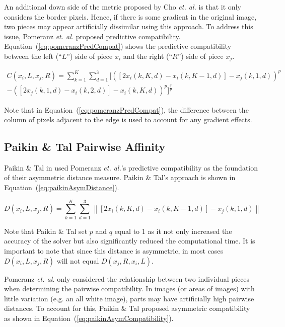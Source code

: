 \documentclass{report}
\def\eref#1{(\ref{#1})}
\newcommand{\norm}[1]{\left\lVert#1\right\rVert}
\begin{document}
An additional down side of the metric proposed by Cho \textit{et. al.} is that it only considers the border pixels.  Hence, if there is some gradient in the original image, two pieces may appear artificially dissimilar using this approach.  To address this issue, Pomeranz \textit{et. al.} proposed predictive compatibility.  Equation~\eref{eq:pomeranzPredCompat} shows the predictive compatibility between the left (``$L$'') side of piece $x_i$ and the right (``$R$'') side of piece $x_j$.  

\begin{equation} \label{eq:pomeranzPredCompat}
\begin{split}
C(x_i,L,x_j,R) = \sum_{k=1}^{K}\sum_{d=1}^{3}\Big[ ([2x_i(k, K, d) - x_i(k, K-1, d)] - x_j(k, 1, d))^p \\ - ([2x_j(k, 1, d) - x_i(k, 2, d)] - x_i(k, K, d))^p\Big]^{\frac{q}{p}}
\end{split}
\end{equation}

Note that in Equation~\eref{eq:pomeranzPredCompat}, the difference between the column of pixels adjacent to the edge is used to account for any gradient effects.

\subsection{Paikin \& Tal Pairwise Affinity}\label{sec:paikinPairwiseAffinity}

Paikin \& Tal in \cite{paikin2015} used Pomeranz \textit{et. al.}'s predictive compatibility as the foundation of their asymmetric distance measure.  Paikin \& Tal's approach is shown in Equation~\eref{eq:paikinAsymDistance}.

\begin{equation} \label{eq:paikinAsymDistance}
D(x_i,L,x_j,R) = \sum_{k=1}^{K}\sum_{d=1}^{3} \norm{[2x_i(k, K, d) - x_i(k, K-1, d)] - x_j(k, 1, d)}
\end{equation}

Note that Paikin \& Tal set $p$ and $q$ equal to 1 as it not only increased the accuracy of the solver but also significantly reduced the computational time.  It is important to note that since this distance is asymmetric, in most cases $D(x_i,L,x_j,R)$ will not equal $D(x_j,R,x_i,L)$.

Pomeranz \textit{et. al.} only considered the relationship between two individual pieces when determining the pairwise compatibility.  In images (or areas of images) with little variation (e.g. an all white image), parts may have artificially high pairwise distances.  To account for this, Paikin \& Tal proposed asymmetric compatibility as shown in Equation~\eref{eq:paikinAsymCompatibility}.
\end{document}
